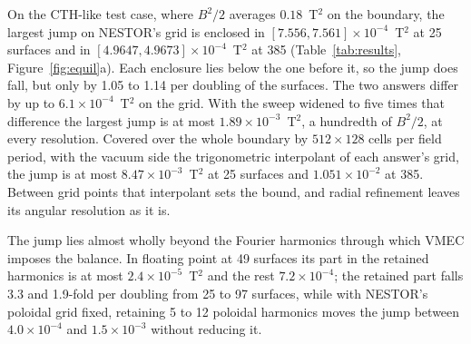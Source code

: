 \documentclass[11pt]{article}
\begin{document}
On the CTH-like test case, where $B^2/2$ averages $0.18$~T$^2$ on the boundary,
the largest jump on NESTOR's grid is enclosed in $[7.556,7.561]\times10^{-4}$~T$^2$
at 25 surfaces and in $[4.9647,4.9673]\times10^{-4}$~T$^2$ at 385
(Table~\ref{tab:results}, Figure~\ref{fig:equil}a). Each enclosure lies below
the one before it, so the jump does fall, but only by 1.05 to 1.14 per doubling
of the surfaces. The two answers differ by up to $6.1\times10^{-4}$~T$^2$ on the
grid. With the sweep widened to five times that difference the largest jump is
at most $1.89\times10^{-3}$~T$^2$, a hundredth of $B^2/2$, at every resolution.
Covered over the whole boundary by $512\times128$ cells per field period, with
the vacuum side the trigonometric interpolant of each answer's grid, the jump is
at most $8.47\times10^{-3}$~T$^2$ at 25 surfaces and $1.051\times10^{-2}$ at
385. Between grid points that interpolant sets the bound, and radial refinement
leaves its angular resolution as it is.

The jump lies almost wholly beyond the Fourier harmonics through which VMEC
imposes the balance. In floating point at 49 surfaces its part in the retained
harmonics is at most $2.4\times10^{-5}$~T$^2$ and the rest $7.2\times10^{-4}$;
the retained part falls 3.3 and 1.9-fold per doubling from 25 to 97 surfaces,
while with NESTOR's poloidal grid fixed, retaining 5 to 12 poloidal harmonics
moves the jump between $4.0\times10^{-4}$ and $1.5\times10^{-3}$ without
reducing it.
\end{document}
